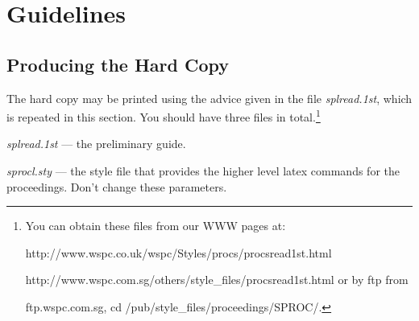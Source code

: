 \author{A. N. OTHER}

\address{Department of Physics, Theoretical Physics, 1 Keble Road,\\
Oxford OX1 3NP, England\\E-mail: other@tp.ox.uk}


\maketitle{}

\section{Guidelines}
\subsection{Producing the Hard Copy}\label{subsec:prod}
The hard copy may be printed using the advice given in
the file {\em splread.1st}, which is repeated in this
section. You should have three files in
total.\footnote{You can obtain these files from our WWW
pages at:

\noindent
{\sf http://www.wspc.co.uk/wspc/Styles/procs/procsread1st.html}

\noindent   
{\sf http://www.wspc.com.sg/others/style\_files/procsread1st.html}
\quad or by ftp from

\noindent
{\sf ftp.wspc.com.sg, cd /pub/style\_files/proceedings/SPROC/.}}

\noindent 
{\em splread.1st} --- the preliminary guide.

\noindent 
{\em sprocl.sty} --- the style file that provides the 
higher level latex commands for the proceedings. Don't 
change these parameters.

